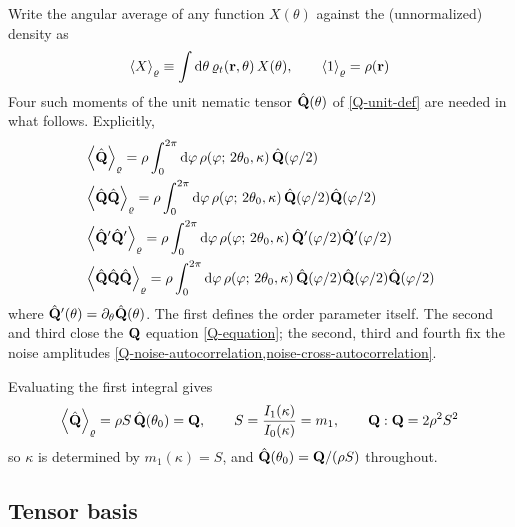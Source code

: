 \documentclass[a5paper]{article}
\begin{document}
Write the angular average of any function $X(\theta)$ against the (unnormalized) density as
\begin{align}
    \label{angular-average}
    \left\langle X \right\rangle_\varrho \equiv \int \mathrm{d}\theta\, \varrho_t(\mathbf{r}, \theta)\, X(\theta),
    \qquad
    \left\langle 1 \right\rangle_\varrho = \rho(\mathbf{r})
\end{align}
Four such moments of the unit nematic tensor $\hat{\mathbf{Q}}(\theta)$ of \cref{Q-unit-def} are needed in what follows. Explicitly,
\begin{subequations}
    \label{moments-integral}
\begin{align}
    &\left\langle \hat{\mathbf{Q}} \right\rangle_\varrho
    = \rho \int_0^{2\pi} \mathrm{d}\varphi\, \rho(\varphi;\,2\theta_0,\kappa)\, \hat{\mathbf{Q}}(\varphi/2)
    \\
    &\left\langle \hat{\mathbf{Q}}\hat{\mathbf{Q}} \right\rangle_\varrho
    = \rho \int_0^{2\pi} \mathrm{d}\varphi\, \rho(\varphi;\,2\theta_0,\kappa)\, \hat{\mathbf{Q}}(\varphi/2)\hat{\mathbf{Q}}(\varphi/2)
    \\
    &\left\langle \hat{\mathbf{Q}}'\hat{\mathbf{Q}}' \right\rangle_\varrho
    = \rho \int_0^{2\pi} \mathrm{d}\varphi\, \rho(\varphi;\,2\theta_0,\kappa)\, \hat{\mathbf{Q}}'(\varphi/2)\hat{\mathbf{Q}}'(\varphi/2)
    \\
    &\left\langle \hat{\mathbf{Q}}\hat{\mathbf{Q}}\hat{\mathbf{Q}} \right\rangle_\varrho
    = \rho \int_0^{2\pi} \mathrm{d}\varphi\, \rho(\varphi;\,2\theta_0,\kappa)\, \hat{\mathbf{Q}}(\varphi/2)\hat{\mathbf{Q}}(\varphi/2)\hat{\mathbf{Q}}(\varphi/2)
\end{align}
\end{subequations}
where $\hat{\mathbf{Q}}'(\theta) = \partial_\theta \hat{\mathbf{Q}}(\theta)$. The first defines the order parameter itself. The second and third close the $\mathbf{Q}$ equation \eqref{Q-equation}; the second, third and fourth fix the noise amplitudes \cref{Q-noise-autocorrelation,noise-cross-autocorrelation}.

Evaluating the first integral gives
\begin{align}
    \label{Q-and-S}
    \left\langle\hat{\mathbf{Q}}\right\rangle_\varrho = \rho S\, \hat{\mathbf{Q}}(\theta_0) = \mathbf{Q},
    \qquad
    S = \frac{I_1(\kappa)}{I_0(\kappa)} = m_1,
    \qquad
    \mathbf{Q}:\mathbf{Q} = 2\rho^2 S^2
\end{align}
so $\kappa$ is determined by $m_1(\kappa) = S$, and $\hat{\mathbf{Q}}(\theta_0) = \mathbf{Q}/(\rho S)$ throughout.

\subsection{Tensor basis}
\label{sec-tensor-basis}
\end{document}
